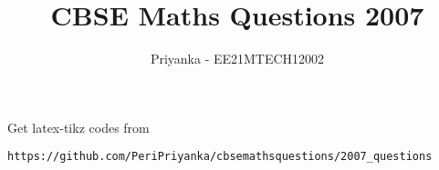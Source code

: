 \documentclass[journal,12pt,twocolumn]{IEEEtran}
\begin{document}
     \def\rightbox#1{\makebox[0in][r]{#1}}
     \def\centbox#1{\makebox[0in]{#1}}
     \def\topbox#1{\raisebox{-\baselineskip}[0in][0in]{#1}}
     \def\midbox#1{\raisebox{-0.5\baselineskip}[0in][0in]{#1}}
\vspace{3cm}
\title{CBSE Maths Questions 2007}
\author{Priyanka - EE21MTECH12002}
\maketitle
\newpage
\bigskip
\renewcommand{\thefigure}{\theenumi}
\renewcommand{\thetable}{\theenumi}
%
Get latex-tikz codes from 
%
\begin{lstlisting}
https://github.com/PeriPriyanka/cbsemathsquestions/2007_questions
\end{lstlisting}

\begin{enumerate}


\end{enumerate}
\end{document}
